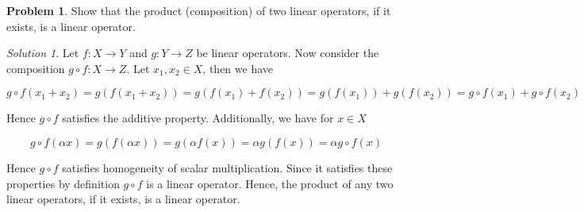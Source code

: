 \documentclass[12pt,a4paper]{article}
\theoremstyle{definition}
\newtheorem{problem}{Problem}
\theoremstyle{remark}
\newtheorem*{solution}{Solution}
\begin{document}
\begin{problem}
    Show that the product (composition) of two linear operators, if it exists, is a linear operator.
\end{problem}
\begin{solution}
    Let $f: X \rightarrow Y$ and $g: Y \rightarrow Z$ be linear operators. Now consider the composition $g \circ f : X \rightarrow Z$. Let $x_1, x_2 \in X$, then we have 

    $$g \circ f (x_1 + x_2) = g(f(x_1+x_2)) = g(f(x_1)+f(x_2)) = g(f(x_1))+ g(f(x_2)) = g \circ f(x_1) + g \circ f(x_2)$$

    Hence $g \circ f$ satisfies the additive property. Additionally, we have for $x \in X$

    $$g \circ f (\alpha x) = g(f(\alpha x)) = g(\alpha f(x)) = \alpha g(f(x)) = \alpha g \circ f(x)$$

    Hence $g \circ f$ satisfies homogeneity of scalar multiplication. Since it satisfies these properties by definition $g \circ f$ is a linear operator. Hence, the product of any two linear operators, if it exists, is a linear operator.
\end{solution}
\end{document}
